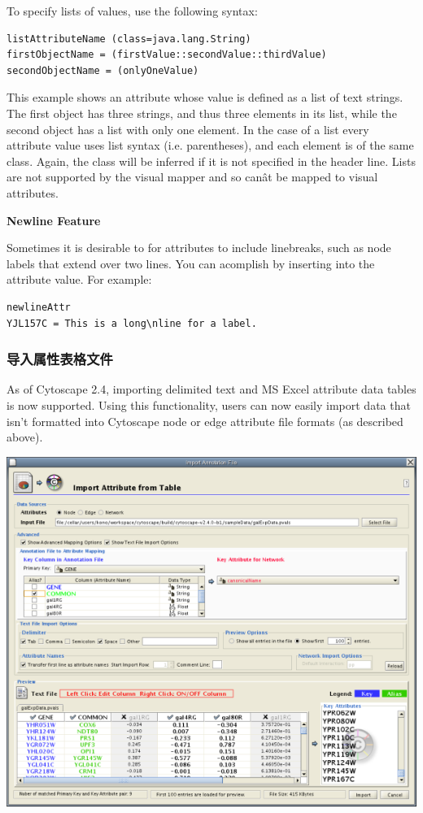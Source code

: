  To specify lists of values, use the following syntax: 

 \begin{verbatim}
listAttributeName (class=java.lang.String)
firstObjectName = (firstValue::secondValue::thirdValue)
secondObjectName = (onlyOneValue)
\end{verbatim}

 This example shows an attribute whose value is defined as a list of text strings. The first object has three strings, and thus three elements in its list, while the second object has a list with only one element. In the case of a list every attribute value uses list syntax (i.e. parentheses), and each element is of the same class. Again, the class will be inferred if it is not specified in the header line. Lists are not supported by the visual mapper and so can\^at be mapped to visual attributes. 


 
\textbf{Newline Feature}


 Sometimes it is desirable to for attributes to include linebreaks, such as node labels that extend over two lines. You can acomplish by inserting   into the attribute value. For example: 

 \begin{verbatim}
newlineAttr
YJL157C = This is a long\nline for a label.
\end{verbatim}

\subsubsection{导入属性表格文件}

 As of Cytoscape 2.4, importing delimited text and MS Excel attribute data tables is now supported. Using this functionality, users can now easily import data that isn't formatted into Cytoscape node or edge attribute file formats (as described above). 

 \includegraphics[scale=1]{images/attribute_table_import_main.png} 


